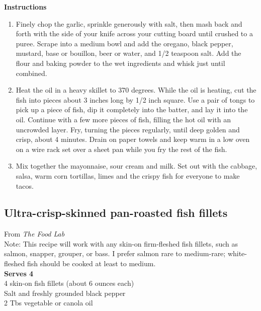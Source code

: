 \documentclass{article}
\numberwithin{figure}{section}
\numberwithin{equation}{section}
\begin{document}
{\bf Instructions}
\begin{enumerate}
\item Finely chop the garlic, sprinkle generously with salt, then mash back and forth with the side of your knife across your cutting board until crushed to a puree. Scrape into a medium bowl and add the oregano, black pepper, mustard, base or bouillon, beer or water, and 1/2 teaspoon salt. Add the flour and baking powder to the wet ingredients and whisk just until combined.

\item Heat the oil in a heavy skillet to 370 degrees. While the oil is heating, cut the fish into pieces about 3 inches long by 1/2 inch square. Use a pair of tongs to pick up a piece of fish, dip it completely into the batter, and lay it into the oil. Continue with a few more pieces of fish, filling the hot oil with an uncrowded layer. Fry, turning the pieces regularly, until deep golden and crisp, about 4 minutes. Drain on paper towels and keep warm in a low oven on a wire rack set over a sheet pan while you fry the rest of the fish.

\item Mix together the mayonnaise, sour cream and milk. Set out with the cabbage, salsa, warm corn tortillas, limes and the crispy fish for everyone to make tacos.
\end{enumerate}

\pagebreak
\subsection{Ultra-crisp-skinned pan-roasted fish fillets}
From {\it The Food Lab}\\
Note: This recipe will work with any skin-on firm-fleshed fish fillets, such as salmon, snapper, grouper, or bass. I prefer salmon rare to medium-rare; white-fleshed fish should be cooked at least to medium.\\

{\bf Serves 4}\\
4 skin-on fish fillets (about 6 ounces each)\\
Salt and freshly grounded black pepper\\
2 Tbs vegetable or canola oil\\
\end{document}
